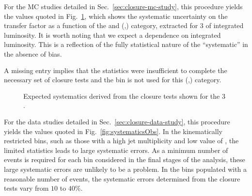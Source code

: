 For the MC studies detailed in Sec.~\ref{sec:closure-mc-study}, this 
procedure yields the values quoted in
Fig.~\ref{fig:systematics}, which shows the systematic uncertainty
on the transfer factor as a function of the \scalht and (\nb,\njet)
category, extracted for 3 \ifb of integrated luminosity.
It is worth noting that we expect a dependence on integrated
luminosity. This is a
reflection of the fully statistical nature of the ``systematic'' in
the absence of bias. 

A missing entry implies that the statistics were
insufficient to complete the necessary set of closure tests and the
\scalht bin is not used for this (\njet,\nb) category. 

\begin{figure}[]
  \centering
  \caption{\label{fig:systematics} Expected systematics derived from the closure tests shown for
the 3 \ifb.}
\end{figure}

For the data studies detailed in Sec.~\ref{sec:closure-data-study},
this procedure yields the values quoted in
Fig.~\ref{fig:systematicsObs}. In the kinematically restricted bins, such
as those with a high jet multiplicity and low value of \scalht, the
limited statistics leads to large systematic errors. As a minimum number of
events is required for each bin considered in the final stages of the
analysis, these large systematic errors are unlikely to be a problem.
In the bins populated with a reasonable number of events, the
systematic errors determined from the closure tests vary from $10$ to
$40\%$.

